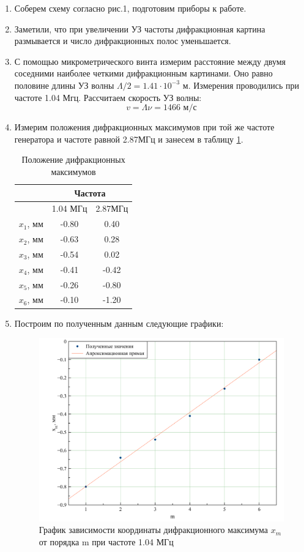 \documentclass[a4paper, 12pt]{article}
\begin{document}
\begin {enumerate}
\item Соберем схему согласно рис.1, подготовим приборы к работе.
\item Заметили, что при увеличении УЗ частоты дифракционная картина размывается и число дифракционных полос уменьшается.
\item С помощью микрометрического винта измерим расстояние между двумя соседними наиболее четкими дифракционным картинами. Оно равно половине длины УЗ волны $ \Lambda/2 = 1.41 \cdot 10^{-3} $ м. Измерения проводились при частоте 1.04 Мгц. Рассчитаем скорость УЗ волны:
\[
	v = \Lambda \nu = 1466\text{ м/с}
\]
\item Измерим положения дифракционных максимумов при той же частоте генератора и частоте равной 2.87МГц и занесем в таблицу \ref{task1}.
\begin{table}[H]
	\centering
	\caption{Положение дифракционных максимумов}
	\label{task1}
	\begin{tabular}{ccc}
		& \multicolumn{2}{c}{Частота} \\ \toprule
		\multicolumn{1}{c|}{} & \multicolumn{1}{c|}{1.04 МГц} & 2.87МГц \\ \midrule
		\multicolumn{1}{c|}{$x_1$, мм} & \multicolumn{1}{c|}{-0.80} & 0.40 \\ \midrule
		\multicolumn{1}{c|}{$x_2$, мм} & \multicolumn{1}{c|}{-0.63} & 0.28 \\ \midrule
		\multicolumn{1}{c|}{$x_3$, мм} & \multicolumn{1}{c|}{-0.54} & 0.02 \\ \midrule
		\multicolumn{1}{c|}{$x_4$, мм} & \multicolumn{1}{c|}{-0.41} & -0.42 \\ \midrule
		\multicolumn{1}{c|}{$x_5$, мм} & \multicolumn{1}{c|}{-0.26} & -0.80 \\ \midrule 
		\multicolumn{1}{c|}{$x_6$, мм} & \multicolumn{1}{c|}{-0.10} & -1.20 \\ \bottomrule
	\end{tabular}
\end{table}
\item Построим по полученным данным следующие графики:

	\begin {figure}[H]
		\begin{center}
			\includegraphics[width = 0.5 \textwidth]{graph1.png}
			\caption{График зависимости координаты дифракционного максимума $x_m$ от порядка m при частоте 1.04 МГц}
		\end{center}
	\end {figure}
	

\end{enumerate}
\end{document}

